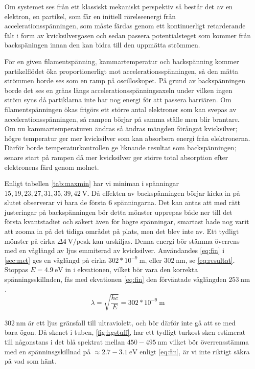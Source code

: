 Om systemet ses från ett klassiskt mekaniskt perspektiv så består det av en elektron, en partikel, som får en initiell rörelseenergi från accelerationsspänningen, som måste färdas genom ett kontinuerligt retarderande fält i form av kvicksilvergasen och sedan passera potentialsteget som kommer från backspäningen innan den kan bidra till den uppmätta strömmen. 

För en given filamentspänning, kammartemperatur och backspänning kommer partikelflödet öka proportionerligt mot accelerationsspänningen, så den mätta strömmen borde ses som en ramp på oscilloskopet. På grund av backspänningen borde det ses en gräns längs accelerationsspänningsaxeln under vilken ingen ström syns då partiklarna inte har nog energi för att passera barriären. Om filamentspänningen ökas frigörs ett större antal elektroner som kan svepas av accelerationsspänningen, så rampen börjar på samma ställe men blir brantare. Om nu kammartemperaturen ändras så ändras mängden förångat kvicksilver; högre temperatur ger mer kvicksilver som kan absorbera energi från elektronerna. Därför borde temperaturkontrollen ge liknande resultat som backspänningen; senare start på rampen då mer kvicksilver ger större total absorption efter elektronens färd genom molnet.


Enligt tabellen \cref{tab:maxmin} har vi miniman i spänningar $15, 19, 23, 27, 31, 35, 39, 42~\textrm{V}$. Då effekten av backspänningen börjar kicka in på slutet observerar vi bara de första $6$ spänningarna. Det kan antas att med rätt justeringar på backspänningen bör detta mönster upprepas både ner till det första kvantstadiet och säkert även för högre spänningar, smartast hade nog varit att zooma in på det tidiga området på plats, men det blev inte av. Ett tydligt mönster på cirka $\Delta 4~\textrm{V/peak}$ kan urskiljas. Denna energi bör stämma överrens med en våglängd av ljus emmiterad av kvicksilver. Användandes \cref{eq:fin} i \cref{sec:met} ges en våglängd på cirka $302*10^{-9}~\textrm{m}$, eller $302~\textrm{nm}$, se \cref{eq:resultat}. Stoppas $E=4.9~\textrm{eV}$ in i ekvationen, vilket bör vara den korrekta spänningsskillnden, fås med ekvationen \cref{eq:fin} den förväntade våglängden $253~\textrm{nm}$\cite{fhbook}.
\begin{equation}\label{eq:resultat} \lambda = \sqrt{\frac{hc}{E}} = 302*10^{-9}~\textrm{m}\end{equation}

$302~\textrm{nm}$ är ett ljus gränsfall till ultraviolett, och bör därför inte gå att se med bara ögon. Då skenet i tuben, \cref{fig:hgstuff}, har ett tydligt turkost sken estimerat till någonstans i det blå spektrat mellan $450 - 495~\textrm{nm}$ vilket bör överrensstämma med en spänninsgskillnad på $\approx 2.7-3.1~\textrm{eV}$ enligt \cref{eq:fin}, är vi inte riktigt säkra på vad som hänt.


